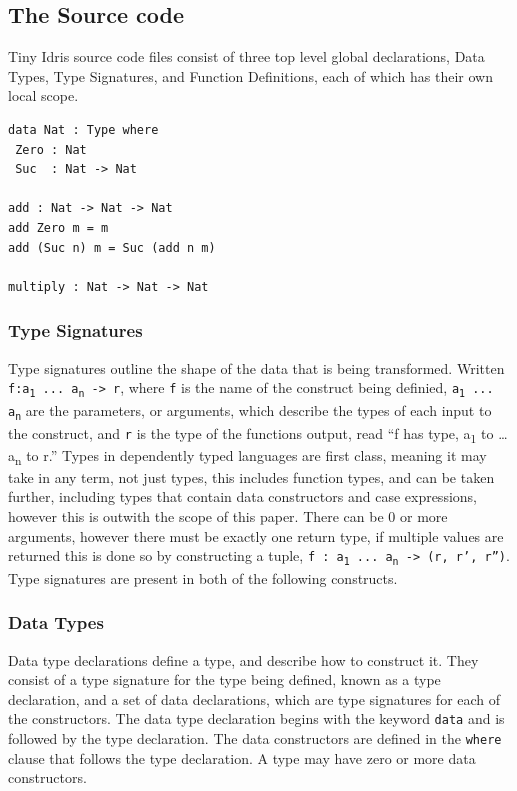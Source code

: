 \documentclass[a4paper]{article}
\begin{document}
\subsection{The Source code}
\label{sec:org85decd2}
Tiny Idris source code files consist of three top level global 
declarations, Data Types, Type Signatures, and Function Definitions,
each of which has their own local scope. 

\begin{center}
\begin{verbatim}
data Nat : Type where
 Zero : Nat
 Suc  : Nat -> Nat

add : Nat -> Nat -> Nat
add Zero m = m
add (Suc n) m = Suc (add n m) 

multiply : Nat -> Nat -> Nat
\end{verbatim}
\end{center}

\subsubsection{Type Signatures}
\label{sec:org6cd40f9}
Type signatures outline the shape of the data that is being transformed.
Written \texttt{f:a\textsubscript{1} ... a\textsubscript{n} -> r}, where \texttt{f} is the name of the construct being definied, \texttt{a\textsubscript{1} ...  a\textsubscript{n}} are
the parameters, or arguments, which describe the types of each input to the construct, and \texttt{r} is the type of the functions output, read ``f has type, a\textsubscript{1} 
to \ldots{} a\textsubscript{n} to r.'' Types in dependently typed languages are first class,
meaning it may take in any term, not just types, this includes function
types, and can be taken further, including types that contain data constructors and case expressions, however this is outwith the scope of
this paper. There can be 0 or more arguments,
however there must be exactly one return type, if multiple values are 
returned this is done so by constructing a tuple,
\texttt{f : a\textsubscript{1} ... a\textsubscript{n} -> (r, r', r'')}. Type signatures are present in both
of the following constructs.

\subsubsection{Data Types}
\label{sec:orga233947}
Data type declarations define a type, and describe how to construct it.
They consist of a type signature for the type being 
defined, known as a type declaration, and a set of data declarations, 
which are type signatures for each of the constructors.
The data type declaration begins with the keyword \texttt{data} and is followed by 
the type declaration. The data constructors are defined in the \texttt{where} 
clause that follows the type declaration. A type may have zero or more
data constructors. 
\end{document}
